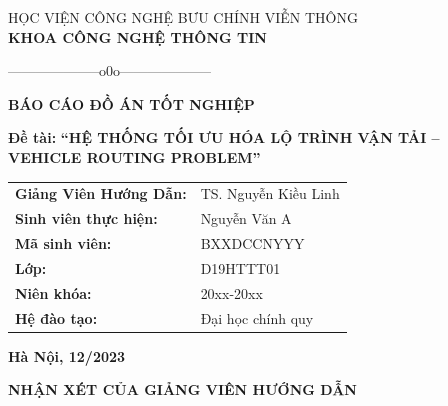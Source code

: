 \documentclass[12pt,a4paper,openany,oneside]{report}
\begin{document}
\setlength{\fboxrule}{1.5pt}
\thisfancypage{\setlength{\fboxsep}{10pt}\setlength{\shadowsize}{0pt}\doublebox}{}

\fontsize{14pt}{14pt}\selectfont \baselineskip 0.65cm
\thispagestyle{empty}
\begin{center}
{HỌC VIỆN CÔNG NGHỆ BƯU CHÍNH VIỄN THÔNG}\\
\textbf{\MakeUppercase{KHOA CÔNG NGHỆ THÔNG TIN}}\\
\centerline{--------------------o0o--------------------}  
\end{center}

\vspace{0.5cm}
\begin{center}
\textbf{\MakeUppercase{\LARGE \bf BÁO CÁO ĐỒ ÁN TỐT NGHIỆP}}\\ 
\end{center} 

\vspace{1cm}
\begin{center}
\textbf{Đề tài:}
\textbf{\MakeUppercase{ \bf ``HỆ THỐNG TỐI ƯU HÓA LỘ TRÌNH VẬN TẢI -- VEHICLE ROUTING PROBLEM''}}\\ 
\end{center} 
\vspace{2cm}

\begin{tabular}{ll}
{\textbf{\large{Giảng Viên Hướng Dẫn: }}} & {\large TS. Nguyễn Kiều Linh}\\
{\textbf{\large{Sinh viên thực hiện:}}}  & {\large Nguyễn Văn A} \\
{\textbf{\large{Mã sinh viên: }}}  & {\large BXXDCCNYYY} \\
{\textbf{\large{Lớp:}}}   & {\large D19HTTT01}\\
{\textbf{\large{Niên khóa:}}}   & {\large 20xx-20xx}\\
{\textbf{\large{Hệ đào tạo:}}}   & {\large Đại học chính quy}
\end{tabular}

\vfill
\begin{center}
{{\bf Hà Nội, 12/2023}}
\end{center}

\newpage
{} 
\thispagestyle{empty}
\begin{center}
{\textbf{\Large{NHẬN XÉT CỦA GIẢNG VIÊN HƯỚNG DẪN}}}
\end{center}
\end{document}
